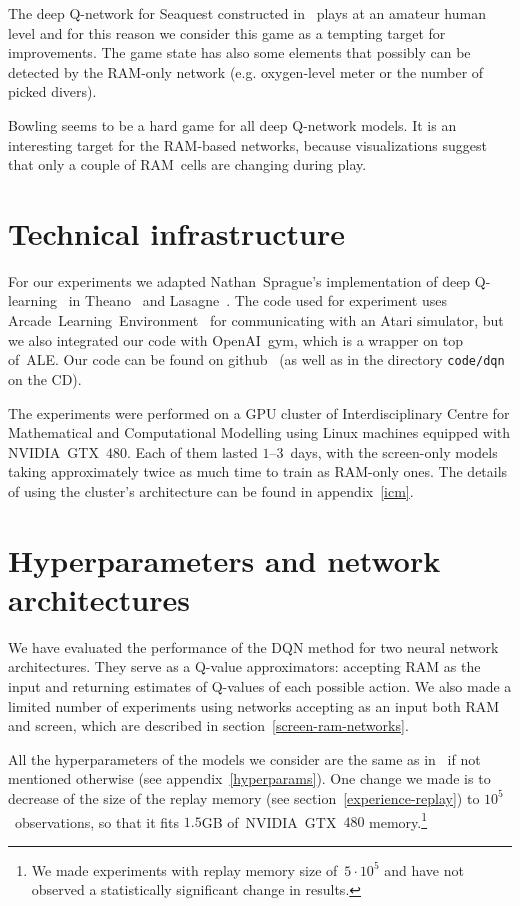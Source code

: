 The deep Q-network for Seaquest constructed in~\cite{nips-dqn} plays at an amateur human level and for this reason we consider this game as a tempting target for improvements. The game state has also some elements that possibly can be detected by the RAM-only network (e.g. oxygen-level meter or the number of picked divers).

Bowling seems to be a hard game for all deep Q-network models. It is an interesting target for the RAM-based networks, because visualizations suggest that only a couple of RAM~cells are changing during play.

\section{Technical infrastructure}\label{technical}
For our experiments we adapted Nathan~Sprague's implementation of deep Q-learning~\cite{sprague} in Theano~\cite{theano} and Lasagne~\cite{lasagne}. The code used for experiment uses Arcade~Learning~Environment~\cite{ale} for communicating with an Atari simulator, but we also integrated our code with OpenAI~gym, which is a wrapper on top of~ALE. Our code can be found on github~\cite{our-dqn} (as well as in the directory \texttt{code/dqn} on the CD).

The experiments were performed on a GPU cluster of Interdisciplinary Centre for Mathematical and Computational Modelling using Linux machines equipped with NVIDIA~GTX~$480$. Each of them lasted $1$--$3$~days, with the screen-only models taking approximately twice as much time to train as RAM-only ones. The details of using the cluster's architecture can be found in appendix~\ref{icm}.

\section{Hyperparameters and network architectures}

We have evaluated the performance of the DQN method for two neural network architectures. They serve as a Q-value approximators: accepting RAM as the input and returning estimates of Q-values of each possible action. We also made a limited number of experiments using networks accepting as an input both RAM and screen, which are described in section~\ref{screen-ram-networks}.

All the hyperparameters of the models we consider are the same as in~\cite{nips-dqn} if not mentioned otherwise (see appendix~\ref{hyperparams}). One change we made is to decrease of the size of the replay memory (see section~\ref{experience-replay}) to $10^5$~observations, so that it fits $1.5$GB of~NVIDIA~GTX~$480$ memory.\footnote{We made experiments with replay memory size of~$5\cdot 10^5$ and have not observed a statistically significant change in results.}


